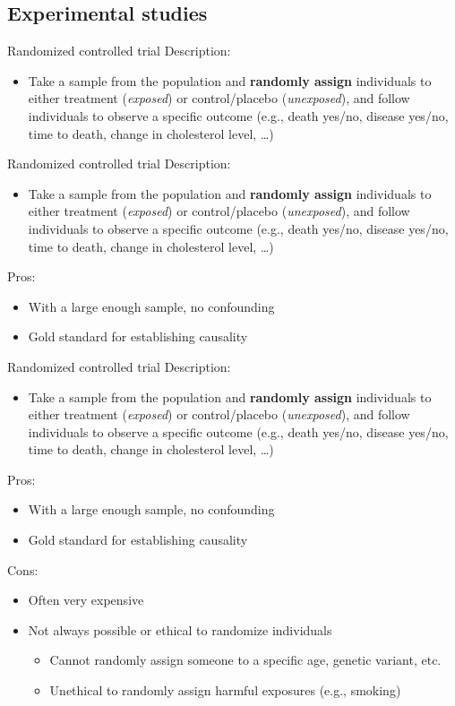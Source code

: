 \documentclass[10pt,t]{beamer}
\begin{document}
\subsection{Experimental studies}

\begin{frame}{Randomized controlled trial}
Description:
\begin{itemize}
	\item Take a sample from the population and \textbf{randomly assign} individuals to either treatment (\textit{exposed}) or control/placebo (\textit{unexposed}), and follow individuals to observe a specific outcome (e.g., death yes/no, disease yes/no, time to death, change in cholesterol level, \dots)
\end{itemize}
\end{frame}

\begin{frame}{Randomized controlled trial}
Description:
\begin{itemize}
	\item Take a sample from the population and \textbf{randomly assign} individuals to either treatment (\textit{exposed}) or control/placebo (\textit{unexposed}), and follow individuals to observe a specific outcome (e.g., death yes/no, disease yes/no, time to death, change in cholesterol level, \dots)
\end{itemize}
Pros:
\begin{itemize}
	\item With a large enough sample, no confounding
	\item Gold standard for establishing causality
\end{itemize}
\end{frame}

\begin{frame}{Randomized controlled trial}
Description:
\begin{itemize}
	\item Take a sample from the population and \textbf{randomly assign} individuals to either treatment (\textit{exposed}) or control/placebo (\textit{unexposed}), and follow individuals to observe a specific outcome (e.g., death yes/no, disease yes/no, time to death, change in cholesterol level, \dots)
\end{itemize}
Pros:
\begin{itemize}
	\item With a large enough sample, no confounding
	\item Gold standard for establishing causality
\end{itemize}
Cons:
\begin{itemize}
	\item Often very expensive
	\item Not always possible or ethical to randomize individuals
	\begin{itemize}
		\item Cannot randomly assign someone to a specific age, genetic variant, etc.
		\item Unethical to randomly assign harmful exposures (e.g., smoking)
	\end{itemize}
\end{itemize}
\end{frame}
\end{document}
